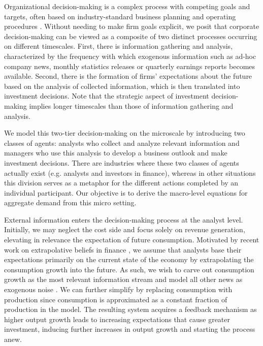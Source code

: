 \documentclass[authoryear, review]{elsarticle}
\begin{document}
Organizational decision-making is a complex process with competing goals and targets, often based on industry-standard business planning and operating procedures \citep{CyertMarch1992, MillerCardinal1994}. Without needing to make firm goals explicit, we posit that corporate decision-making can be viewed as a composite of two distinct processes occurring on different timescales. First, there is information gathering and analysis, characterized by the frequency with which exogenous information such as ad-hoc company news, monthly statistics releases or quarterly earnings reports becomes available. Second, there is the formation of firms’ expectations about the future based on the analysis of collected information, which is then translated into investment decisions. Note that the strategic aspect of investment decision-making implies longer timescales than those of information gathering and analysis.

We model this two-tier decision-making on the microscale by introducing two classes of agents: analysts who collect and analyze relevant information and managers who use this analysis to develop a business outlook and make investment decisions. There are industries where these two classes of agents actually exist (e.g. analysts and investors in finance), whereas in other situations this division serves as a metaphor for the different actions completed by an individual participant. Our objective is to derive the macro-level equations for aggregate demand from this micro setting. 

External information enters the decision-making process at the analyst level. Initially, we may neglect the cost side and focus solely on revenue generation, elevating in relevance the expectation of future consumption. Motivated by recent work on extrapolative beliefs in finance \citep{GreenwoodShleifer2014, KuchlerZafar2019, DaEtAl2021}, we assume that analysts base their expectations primarily on the current state of the economy by extrapolating the consumption growth into the future. As such, we wish to carve out consumption growth as the most relevant information stream and model all other news as exogenous noise \citep[treating news shocks similarly to][]{AngeletosLaO2013,AngeletosEtAl2020,BeaudryPortier2014}. We can further simplify by replacing consumption with production since consumption is approximated as a constant fraction of production in the model. The resulting system acquires a feedback mechanism as higher output growth leads to increasing expectations that cause greater investment, inducing further increases in output growth and starting the process anew.
\end{document}
